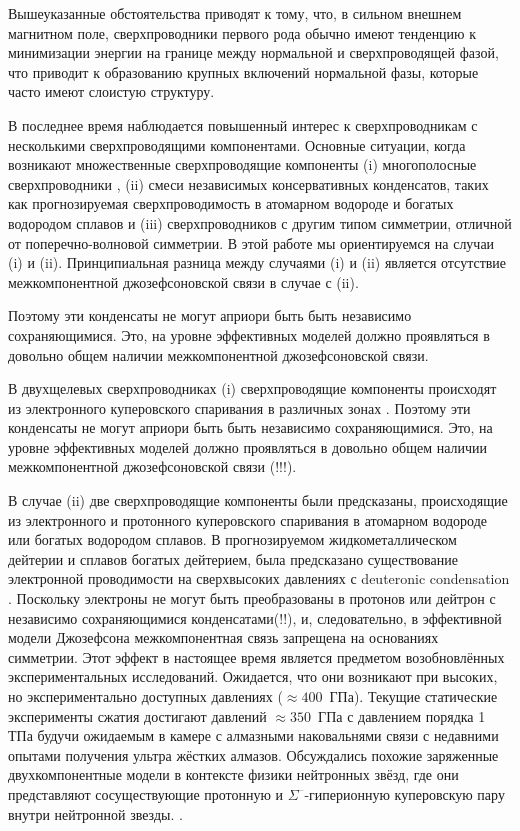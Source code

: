 Вышеуказанные обстоятельства приводят к тому, что, в сильном внешнем магнитном 
поле, сверхпроводники первого рода обычно имеют тенденцию к минимизации 
энергии на границе между нормальной и сверхпроводящей фазой, что приводит к 
образованию крупных включений нормальной фазы, которые часто имеют слоистую 
структуру\cite{bib:4}. 

В последнее время наблюдается повышенный интерес к сверхпроводникам с 
несколькими сверхпроводящими компонентами. Основные ситуации, когда возникают 
множественные сверхпроводящие компоненты (i) многополосные сверхпроводники
\cite{bib:6,bib:7,bib:8,bib:9,bib:10,bib:11}, (ii) смеси независимых 
консервативных конденсатов, таких как прогнозируемая сверхпроводимость в 
атомарном водороде и богатых водородом сплавов \cite{bib:12,bib:13,bib:14} и 
(iii) сверхпроводников с другим типом симметрии, отличной от 
поперечно-волновой симметрии. В этой работе мы ориентируемся на случаи (i) и 
(ii). Принципиальная разница между случаями (i) и (ii) является отсутствие 
межкомпонентной джозефсоновской связи в случае с (ii).

Поэтому эти конденсаты не могут априори быть быть независимо сохраняющимися.
Это, на уровне эффективных моделей должно проявляться в довольно общем наличии 
межкомпонентной джозефсоновской связи.

В двухщелевых сверхпроводниках (i) сверхпроводящие компоненты происходят из
электронного куперовского спаривания в различных зонах \cite{bib:6}. Поэтому 
эти конденсаты не могут априори быть быть независимо сохраняющимися. Это, на 
уровне эффективных моделей должно проявляться в довольно общем наличии 
межкомпонентной джозефсоновской связи (!!!).

В случае (ii) две сверхпроводящие компоненты были предсказаны, происходящие 
из электронного и протонного куперовского спаривания в атомарном водороде 
или богатых водородом сплавов. В прогнозируемом жидкометаллическом дейтерии и 
сплавов богатых дейтерием, была предсказано существование электронной 
проводимости на сверхвысоких давлениях с deuteronic condensation 
\cite{bib:12,bib:13,bib:14}. Поскольку электроны не могут быть преобразованы в 
протонов или дейтрон с независимо сохраняющимися конденсатами(!!), и, 
следовательно, в эффективной модели Джозефсона межкомпонентная связь запрещена 
на основаниях симметрии. Этот эффект в настоящее время является предметом 
возобновлённых экспериментальных исследований. Ожидается, что они возникают 
при высоких, но экспериментально доступных давлениях (\( \approx 400 \)~ГПа). 
Текущие статические эксперименты сжатия достигают давлений 
\( \approx 350 \)~ГПа с давлением порядка 1 ТПа будучи ожидаемым в камере с 
алмазными наковальнями связи с недавними опытами получения ультра жёстких 
алмазов. Обсуждались похожие заряженные двухкомпонентные модели в контексте 
физики нейтронных звёзд, где они представляют сосуществующие протонную и 
\( \Sigma^\text{--} \)-гиперионную куперовскую пару внутри нейтронной звезды.
\cite{bib:15}. 

